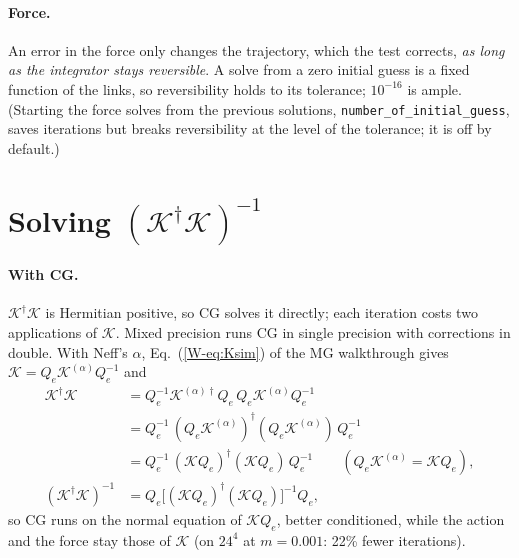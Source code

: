 \documentclass[11pt,a4paper]{article}
\numberwithin{equation}{section}
\newcommand{\dg}{^{\dagger}}
\newcommand{\code}[1]{\texttt{\small #1}}
\begin{document}
\paragraph{Force.} An error in the force only changes the trajectory, which the test corrects,
\emph{as long as the integrator stays reversible}. A solve from a zero initial guess is a fixed
function of the links, so reversibility holds to its tolerance; $10^{-16}$ is ample. (Starting the
force solves from the previous solutions, \code{number\_of\_initial\_guess}, saves iterations but
breaks reversibility at the level of the tolerance; it is off by default.)

\section{Solving $(\mathcal K\dg \mathcal K)^{-1}$}
\paragraph{With CG.} $\mathcal K\dg \mathcal K$ is Hermitian positive, so CG solves it directly; each iteration costs
two applications of $\mathcal K$. Mixed precision runs CG in single precision with corrections in double.
With Neff's $\alpha$, Eq.~(\ref{W-eq:Ksim}) of the MG walkthrough gives $\mathcal K=Q_e\mathcal K^{(\alpha)}Q_e^{-1}$ and
\begin{align}
\mathcal K\dg \mathcal K&=Q_e^{-1}\mathcal K^{(\alpha)\dagger}Q_e\,Q_e\mathcal K^{(\alpha)}Q_e^{-1}\nonumber\\
&=Q_e^{-1}\,(Q_e\mathcal K^{(\alpha)})\dg(Q_e\mathcal K^{(\alpha)})\,Q_e^{-1}\nonumber\\
&=Q_e^{-1}\,(\mathcal KQ_e)\dg(\mathcal KQ_e)\,Q_e^{-1}\qquad(Q_e\mathcal K^{(\alpha)}=\mathcal KQ_e),\nonumber\\
(\mathcal K\dg \mathcal K)^{-1}&=Q_e\big[(\mathcal KQ_e)\dg(\mathcal KQ_e)\big]^{-1}Q_e ,
\end{align}
so CG runs on the normal equation of $\mathcal KQ_e$, better conditioned, while the action and the force stay
those of $\mathcal K$ (on $24^4$ at $m=0.001$: 22\% fewer iterations).
\end{document}
